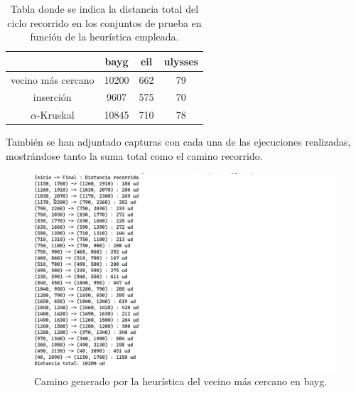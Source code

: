 \begin{table}[H]
    \centering
    \begin{tabular}{|c|c|c|c|}
      \hline
      & bayg & eil & ulysses \\
      \hline
      vecino más cercano & 10200 & 662 & 79 \\
      \hline
      inserción & 9607 & 575 & 70 \\
      \hline
      $\alpha$-Kruskal & 10845 & 710 & 78 \\
      \hline
    \end{tabular}
    \caption{Tabla donde se indica la distancia total del ciclo recorrido en los conjuntos de prueba
    en función de la heurística empleada.}
\end{table}



También se han adjuntado capturas con cada una de las ejecuciones realizadas, mostrándose tanto la suma
total como el camino recorrido.

\begin{figure}[H]
  \centering
  \includegraphics[scale=0.5]{img/dist-vecinos-bayg.png}
  \caption{Camino generado por la heurística del vecino más cercano en bayg.}
\end{figure}

